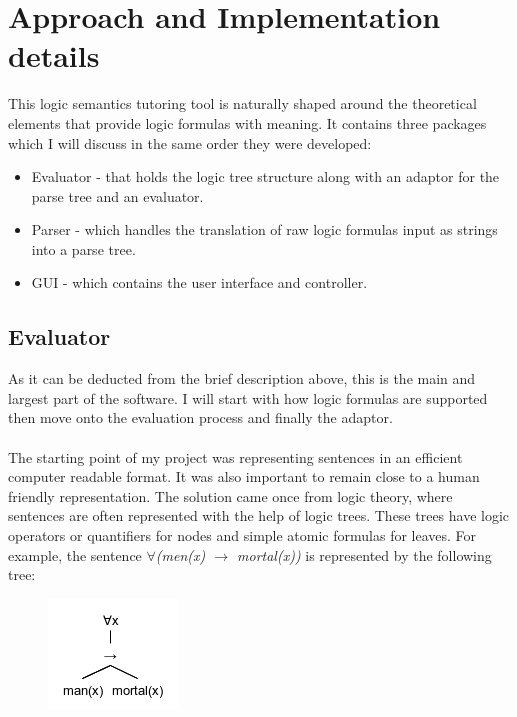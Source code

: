 \documentclass{report}
\begin{document}

\chapter{Approach and Implementation details}

This logic semantics tutoring tool is naturally shaped around the theoretical 
elements that provide logic formulas with meaning. It contains three packages 
which I will discuss in the same order they were developed:

  \begin{itemize}
  \item Evaluator - that holds the logic tree structure along with an adaptor 
  for the parse tree and an evaluator.
  \item Parser - which handles the translation of raw logic formulas input as 
  strings into a parse tree.
  \item GUI - which contains the user interface and controller.
  \end{itemize}

\section{Evaluator}
As it can be deducted from the brief description above, this is the main and 
largest part of the software. I will start with how logic formulas are supported 
then move onto the evaluation process and finally the adaptor. 
\\ \\
The starting point of my project was representing sentences in an efficient 
computer readable format. It was also important to remain close to a human 
friendly representation. The solution came once from logic theory, where 
sentences are often represented with the help of logic trees. These trees have 
logic operators or quantifiers for nodes and simple atomic formulas for leaves. 
For example, the sentence \emph{$\forall$(men(x) $\rightarrow$ mortal(x))} is 
represented by the following tree:

\begin{figure}[h!]
\centering \includegraphics{mortal.png}
\end{figure}
\newpage
\end{document}
